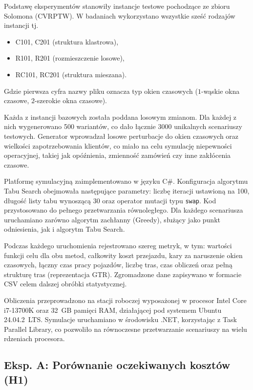 Podstawę eksperymentów stanowiły instancje testowe pochodzące ze zbioru Solomona (CVRPTW). W badaniach wykorzystano wszystkie sześć rodzajów instancji tj.
\begin{itemize}
    \item C101, C201 (struktura klastrowa),
    \item R101, R201 (rozmieszczenie losowe),
    \item RC101, RC201 (struktura mieszana).
\end{itemize}
Gdzie pierwsza cyfra nazwy pliku oznacza typ okien czasowych ($1$-wąskie okna czasowe, $2$-szerokie okna czasowe).

Każda z instancji bazowych została poddana losowym zmianom. Dla każdej z nich wygenerowano 500 wariantów, co dało łącznie 3000 unikalnych scenariuszy testowych. Generator wprowadzał losowe perturbacje do okien czasowych oraz wielkości zapotrzebowania klientów, co miało na celu symulację niepewności operacyjnej, takiej jak opóźnienia, zmienność zamówień czy inne zakłócenia czasowe.

Platformę symulacyjną zaimplementowano w języku C\#. Konfiguracja algorytmu Tabu Search obejmowała następujące parametry: liczbę iteracji ustawioną na 100, długość listy tabu wynoszącą 30 oraz operator mutacji typu \texttt{swap}. Kod przystosowano do pełnego przetwarzania równoległego. Dla każdego scenariusza uruchamiano zarówno algorytm zachłanny (Greedy), służący jako punkt odniesienia, jak i algorytm Tabu Search.

Podczas każdego uruchomienia rejestrowano szereg metryk, w tym: wartości funkcji celu dla obu metod, całkowity koszt przejazdu, kary za naruszenie okien czasowych, łączny czas pracy pojazdów, liczbę tras, czas obliczeń oraz pełną strukturę tras (reprezentacja GTR). Zgromadzone dane zapisywano w formacie CSV celem dalszej obróbki statystycznej.


Obliczenia przeprowadzono na stacji roboczej wyposażonej w procesor Intel Core i7-13700K oraz 32~GB pamięci RAM, działającej pod systemem Ubuntu 24.04.2~LTS. Symulacje uruchamiano w środowisku .NET, korzystając z Task Parallel Library, co pozwoliło na równoczesne przetwarzanie scenariuszy na wielu rdzeniach procesora.

\subsection{Eksp. A: Porównanie oczekiwanych kosztów (H1)}

